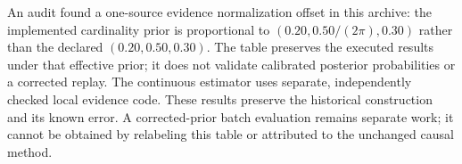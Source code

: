 \begin{table}[t]\centering\small
\caption{Archived joint cardinality-and-support decisions. Onset, load
family and operating context are supplied. These are noise replays of
shared physical trajectories, not independent continuous detections.}
\label{tab:archived-support-bridge}

\end{table}

An audit found a one-source evidence normalization offset in this
archive: the implemented cardinality prior is proportional to
$(0.20,0.50/(2\pi),0.30)$ rather than the declared $(0.20,0.50,0.30)$.
The table preserves the executed results under that effective prior;
it does not validate calibrated posterior probabilities or a corrected
replay. The continuous estimator uses separate, independently checked
local evidence code. These results preserve the historical construction and its known error.
A corrected-prior batch evaluation remains separate work; it cannot be
obtained by relabeling this table or attributed to the unchanged causal
method.
